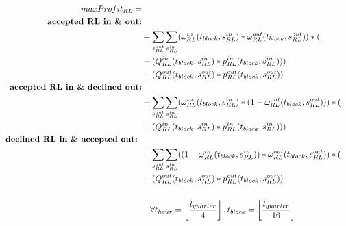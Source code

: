 \begin{alignat}{3}
	\label{eq:RL}
	\\max Profit_{RL}  = 						\notag                                                                                                                        \\
	\textbf{accepted  RL in \& out:}            \notag                                                                                                      \\
	 & + \sum_{s^{out}_{RL}} \sum_{s^{in}_{RL}} (\omega^{in}_{RL}(t_{block}, s^{in}_{RL}) * \omega^{out}_{RL}(t_{block}, s^{out}_{RL}))      * (				\notag  \\
	 & + (Q^{in}_{RL}(t_{block}, s^{in}_{RL})        * p^{in}_{RL}(t_{block}, s^{in}_{RL})))				\notag                                                      \\
	 & + (Q^{out}_{RL}(t_{block}, s^{out}_{RL})      * p^{out}_{RL}(t_{block}, s^{out}_{RL}))				\notag                                                     \\
	\textbf{accepted RL in \& declined out:}        \notag                                                                                                  \\
	 & + \sum_{s^{out}_{RL}} \sum_{s^{in}_{RL}} (\omega^{in}_{RL}(t_{block}, s^{in}_{RL}) * (1-\omega^{out}_{RL}(t_{block}, s^{out}_{RL})))   * (				\notag \\
	 & + (Q^{in}_{RL}(t_{block}, s^{in}_{RL})        * p^{in}_{RL}(t_{block}, s^{in}_{RL})))				\notag                                                      \\
	\textbf{declined RL in \& accepted out:	}	\notag                                                                                                        \\
	 & + \sum_{s^{out}_{RL}} \sum_{s^{in}_{RL}} ((1-\omega^{in}_{RL}(t_{block}, s^{in}_{RL})) * \omega^{out}_{RL}(t_{block}, s^{out}_{RL}))   * (				\notag \\
	 & + (Q^{out}_{RL}(t_{block}, s^{out}_{RL})      * p^{out}_{RL}(t_{block}, s^{out}_{RL}))			\notag                                                      \\                                                                                                                                          \\
	 & \quad\forall t_{hour} = \left\lfloor \frac{t_{quarter}}{4} \right\rfloor, t_{block} = \left\lfloor \frac{t_{quarter}}{16} \right\rfloor    \notag
\end{alignat}

